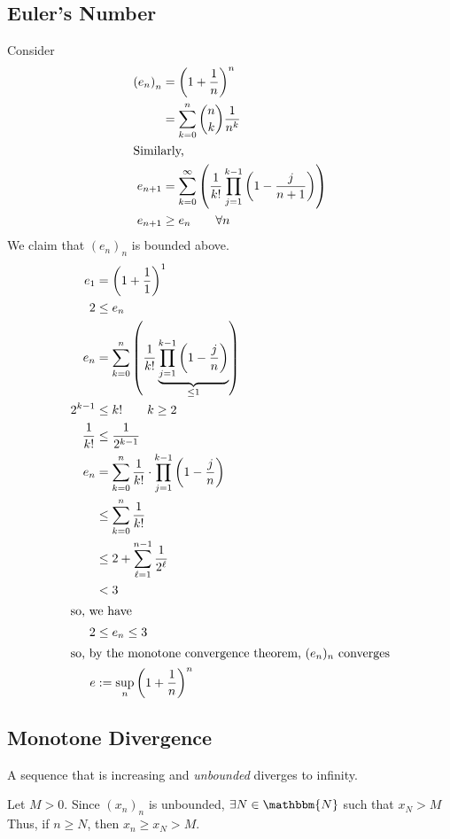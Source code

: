 \documentclass[10pt]{extarticle}
\newcommand{\N}{\mathbbm{N}}
\begin{document}
  \subsection{Euler's Number}%
    Consider
    \begin{align*}
      \left(e_n\right)_n &= \left(1 + \frac{1}{n}\right)^n\\
                         &= \sum_{k=0}^{n} {n\choose k}\frac{1}{n^k}\\
                         \shortintertext{Similarly,}
      e_{n+1} &= \sum_{k=0}^{\infty}\left(\frac{1}{k!} \prod_{j=1}^{k-1}\left(1-\frac{j}{n+1}\right)\right)\\
      e_{n+1} &\geq e_{n} \tag*{$\forall n$}
    \end{align*}
    We claim that $(e_n)_n$ is bounded above.
    \begin{align*}
      e_{1} &= \left(1 + \frac{1}{1}\right)^{1}\\
      2 &\leq e_n\\
      e_{n} &= \sum_{k=0}^{n}\left(\frac{1}{k!} \underbrace{\prod_{j=1}^{k-1}\left(1-\frac{j}{n}\right)}_{\leq 1}\right)\\
      2^{k-1} &\leq k!\tag*{$k\geq 2$}\\
      \frac{1}{k!} &\leq \frac{1}{2^{k-1}}\\
      e_{n} &= \sum_{k=0}^{n} \frac{1}{k!} \cdot \prod_{j=1}^{k-1}\left(1 - \frac{j}{n}\right)\\
            &\leq \sum_{k=0}^{n}\frac{1}{k!}\\
            &\leq 2 + \sum_{\ell=1}^{n-1} \frac{1}{2^{\ell}}\\
            &< 3\\
            \shortintertext{so, we have}
      2 &\leq e_{n} \leq 3\\
      \shortintertext{so, by the monotone convergence theorem, $(e_n)_n$ converges}
      e &:= \sup_{n}\left(1 + \frac{1}{n}\right)^{n}
    \end{align*}
  \subsection{Monotone Divergence}%
  A sequence that is increasing and \textsl{unbounded} diverges to infinity.

    Let $M > 0$. Since $\left(x_{n}\right)_n$ is unbounded, $\exists N\in\N$ such that $x_{N} > M$\\

    Thus, if $n \geq N$, then $x_{n} \geq x_{N} > M$.\\
\end{document}
